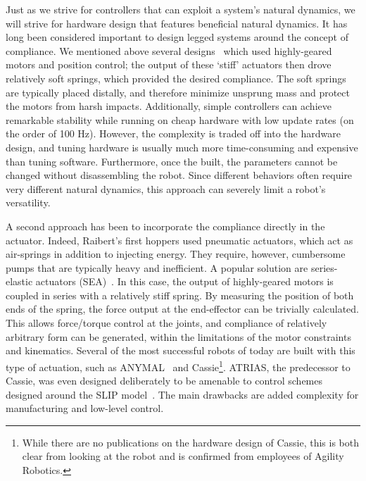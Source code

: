 Just as we strive for controllers that can exploit a system's natural dynamics, we will strive for hardware design that features beneficial natural dynamics.
It has long been considered important to design legged systems around the concept of compliance.
We mentioned above several designs~\cite{sprowitz2013towards,buchli2006resonance,altendorfer2001rhex,owaki2013simple} which used highly-geared motors and position control; the output of these `stiff' actuators then drove relatively soft springs, which provided the desired compliance. The soft springs are typically placed distally, and therefore minimize unsprung mass and protect the motors from harsh impacts. Additionally, simple controllers can achieve remarkable stability while running on cheap hardware with low update rates (on the order of 100 Hz). However, the complexity is traded off into the hardware design, and tuning hardware is usually much more time-consuming and expensive than tuning software. Furthermore, once the built, the parameters cannot be changed without disassembling the robot. Since different behaviors often require very different natural dynamics, this approach can severely limit a robot's versatility. \par
A second approach has been to incorporate the compliance directly in the actuator. Indeed, Raibert's first hoppers used pneumatic actuators, which act as air-springs in addition to injecting energy. They require, however, cumbersome pumps that are typically heavy and inefficient.
A popular solution are series-elastic actuators (SEA)~\cite{pratt1995series}. In this case, the output of highly-geared motors is coupled in series with a relatively stiff spring. By measuring the position of both ends of the spring, the force output at the end-effector can be trivially calculated. This allows force/torque control at the joints, and compliance of relatively arbitrary form can be generated, within the limitations of the motor constraints and kinematics. Several of the most successful robots of today are built with this type of actuation, such as ANYMAL~\cite{hutter2016anymal} and Cassie\footnote{While there are no publications on the hardware design of Cassie, this is both clear from looking at the robot and is confirmed from employees of Agility Robotics.}. ATRIAS, the predecessor to Cassie, was even designed deliberately to be amenable to control schemes designed around the SLIP model~\cite{hubicki2016atrias}. The main drawbacks are added complexity for manufacturing and low-level control.
